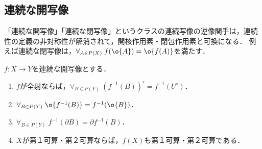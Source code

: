 \documentclass[uplatex,dvipdfmx]{jsreport}
\begin{document}
\subsection{連続な開写像}

\begin{tcolorbox}[colframe=ForestGreen, colback=ForestGreen!10!white,breakable,colbacktitle=ForestGreen!40!white,coltitle=black,fonttitle=\bfseries\sffamily,
title=]
    「連続な開写像」「連続な閉写像」というクラスの連続写像の逆像関手は，連続性の定義の非対称性が解消されて，開核作用素・閉包作用素と可換になる．
    例えば連続な閉写像は，$\forall_{A\in P(X)}\;f(\o{A})=\o{f(A)}$を満たす．
\end{tcolorbox}

\begin{proposition}[連続開写像の性質]
    $f:X\to Y$を連続な開写像とする．
    \begin{enumerate}
        \item $f$が全射ならば，$\forall_{B\in P(Y)}\;(f^{-1}(B))^\circ=f^{-1}(U^\circ)$．
        \item $\forall_{B\in P(Y)}\;\o{f^{-1}(B)}=f^{-1}(\o{B})$．
        \item $\forall_{B\in P(Y)}\;f^{-1}(\partial B)=\partial f^{-1}(B)$．
        \item $X$が第１可算・第２可算ならば，$f(X)$も第１可算・第２可算である．
    \end{enumerate}
\end{proposition}
\end{document}
